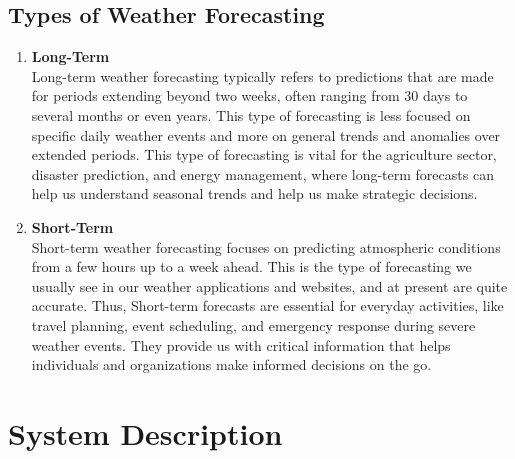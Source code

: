 \documentclass[12pt, a4paper]{article}
\begin{document}
\subsection{Types of Weather Forecasting}
\begin{enumerate}
    \item \textbf{Long-Term} \\
    Long-term weather forecasting typically refers to predictions that are made for periods extending beyond two weeks, often ranging from 30 days to several months or even years. This type of forecasting is less focused on specific daily weather events and more on general trends and anomalies over extended periods.
    This type of forecasting is vital for the agriculture sector, disaster prediction, and energy management, where long-term forecasts can help us understand seasonal trends and help us make strategic decisions.
    \item \textbf{Short-Term}\\
    Short-term weather forecasting focuses on predicting atmospheric conditions from a few hours up to a week ahead. This is the type of forecasting we usually see in our weather applications and websites, and at present are quite accurate.
    Thus, Short-term forecasts are essential for everyday activities, like travel planning, event scheduling, and emergency response during severe weather events. They provide us with critical information that helps individuals and organizations make informed decisions on the go.
\end{enumerate}
\newpage
\section{System Description}
\end{document}
